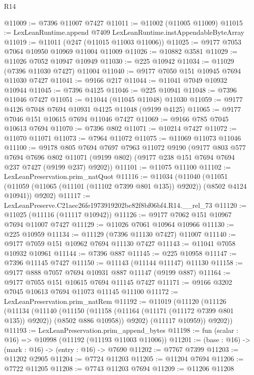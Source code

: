 \begin{lexlean}{R14}
\begin{coremodule}
@11009 := @7396 @11007 @7427
@11011 := @11002 (@11005 @11009)
@11015 := LexLeanRuntime.append @7409 LexLeanRuntime.instAppendableByteArray
@11019 := @11011 (@247 (@11015 @11003 @11006))
@11025 := @9177 @7053 @7064 @10950 @10969 @11004 @11009
@11026 := @10882 @3581
@11029 := @11026 @7052 @10947 @10949
@11030 := @225 @10942
@11034 := @11029 (@7396 @11030 @7427) @11004
@11040 := @9177 @7050 @151 @10945 @7694 @11030 @7427
@11041 := @9166 @217
@11044 := @11041 @7049 @10932 @10944
@11045 := @7396 @4125
@11046 := @225 @10941
@11048 := @7396 @11046 @7427
@11051 := @11044 (@11045 @11048) @11030
@11059 := @9177 @4126 @7048 @7694 @10931 @4125 @11048 (@9199 @4125)
@11065 := @9177 @7046 @151 @10615 @7694 @11046 @7427
@11069 := @9166 @785 @7045 @10613 @7694
@11070 := @7396 @802
@11071 := @10214 @7427
@11072 := @11070 @11071
@11073 := @7964 @11072
@11075 := @11069 @11073 @11046
@11100 := @9178
    @805
    @7694
    @7697
    @7963
    @11072
    @9190
    (@9177
      @803
      @577
      @7694
      @7696
      @802
      @11071
      (@9199 @802)
      (@9177 @238 @151 @7694 @7694 @237 @7427 (@9199 @237) @9202))
@11101 := @11075 @11100
@11102 := LexLeanPreservation.prim_natQuot
@11116 := @11034
    (@11040
      (@11051 (@11059 (@11065 (@11101 (@11102 @7399 @801 @135)) @9202)) (@8502 @4124 @10941))
      @9202)
@11117 := LexLeanPreserve.C21aec26fe1973919202bc82f8bf06bf4.R14.__rel_73
@11120 := @11025 (@11116 (@11117 @10942))
@11126 := @9177 @7062 @151 @10967 @7694 @11007 @7427
@11129 := @11026 @7061 @10964 @10966
@11130 := @225 @10959
@11134 := @11129 (@7396 @11130 @7427) @11007
@11140 := @9177 @7059 @151 @10962 @7694 @11130 @7427
@11143 := @11041 @7058 @10932 @10961
@11144 := @7396 @887
@11145 := @225 @10958
@11147 := @7396 @11145 @7427
@11150 := @11143 (@11144 @11147) @11130
@11158 := @9177 @888 @7057 @7694 @10931 @887 @11147 (@9199 @887)
@11164 := @9177 @7055 @151 @10615 @7694 @11145 @7427
@11171 := @9166 @3202 @7045 @10613 @7694 @11073 @11145 @11100
@11172 := LexLeanPreservation.prim_natRem
@11192 := @11019
    (@11120
      (@11126
        (@11134
          (@11140
            (@11150 (@11158 (@11164 (@11171 (@11172 @7399 @801 @135)) @9202)) (@8502 @886 @10958))
            @9202)
          (@11117 @10959))
        @9202))
@11193 := LexLeanPreservation.prim_append_bytes
@11198 := fun (scalar : @16) => @10998 (@11192 (@11193 @11003 @11006))
@11201 := (base : @16) -> (mark : @16) -> (entry : @16) -> @7690
@11202 := @7767 @7399
@11203 := @11202 @2905
@11204 := @7724 @11203
@11205 := @11204 @7694
@11206 := @7722 @11205
@11208 := @7743 @11203 @7694
@11209 := @11206 @11208

\end{coremodule}
\end{lexlean}
